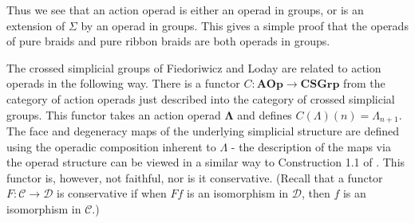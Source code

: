 \documentclass{amsbook} %
\newcommand{\ML}{\mathbf{\Lambda}}
\numberwithin{section}{chapter}
\begin{document}
\begin{rem}
Thus we see that an action operad is either an operad in groups, or is an extension of $\Sigma$ by an operad in groups. This gives a simple proof that the operads of pure braids and pure ribbon braids are both operads in groups.
\end{rem}

\begin{rem}
The crossed simplicial groups of Fiedoriwicz and Loday \cite{FL91} are related to action operads in the following way. There is a functor $C \colon \mathbf{AOp} \rightarrow \mathbf{CSGrp}$ from the category of action operads just described into the category of crossed simplicial groups. This functor takes an action operad $\ML$ and defines $C(\Lambda)(n) = \Lambda_{n+1}$. The face and degeneracy maps of the underlying simplicial structure are defined using the operadic composition inherent to $\Lambda$ - the description of the maps via the operad structure can be viewed in a similar way to Construction 1.1 of \cite{Kra96}. This functor is, however, not faithful, nor is it conservative. (Recall that a functor $F \colon \mathcal{C} \rightarrow \mathcal{D}$ is conservative if when $Ff$ is an isomorphism in $\mathcal{D}$, then $f$ is an isomorphism in $\mathcal{C}$.)
\end{rem}
\end{document}
